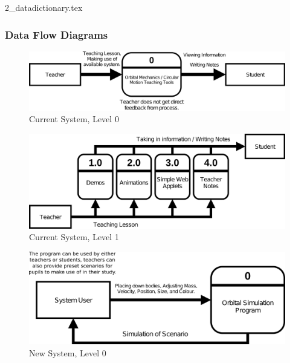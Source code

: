 {2_datadictionary.tex}

\pagebreak

\subsubsection{Data Flow Diagrams}

\begin{figure}[!ht]
  \centering
  \includegraphics[width=\textwidth]{img/csl0.png}
  \caption{Current System, Level 0}
\end{figure}

\begin{figure}[!ht]
  \centering
  \includegraphics[width=\textwidth]{img/csl1.png}
  \caption{Current System, Level 1}
\end{figure}

\begin{figure}[H]
  \centering
  \includegraphics[width=\textwidth]{img/nsl0.png}
  \caption{New System, Level 0}
\end{figure}

